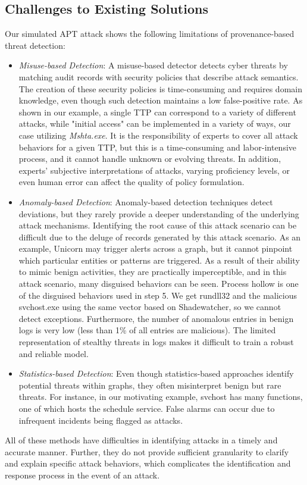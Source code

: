 \subsection{Challenges to Existing Solutions}
Our simulated APT attack shows the following limitations of provenance-based threat detection:
\begin{itemize}
    \item \textit{Misuse-based Detection}:  A misuse-based detector\cite{milajerdi2019holmes,milajerdi2019poirot} detects cyber threats by matching audit records with security policies that describe attack semantics. The creation of these security policies is time-consuming and requires domain knowledge, even though such detection maintains a low false-positive rate. As shown in our example, a single TTP can correspond to a variety of different attacks, while "initial access" can be implemented in a variety of ways, our case utilizing \textit{Mshta.exe}. It is the responsibility of experts to cover all attack behaviors for a given TTP, but this is a time-consuming and labor-intensive process, and it cannot handle unknown or evolving threats. In addition, experts' subjective interpretations of attacks, varying proficiency levels, or even human error can affect the quality of policy formulation.
    \item \textit{Anomaly-based Detection}: Anomaly-based detection techniques detect deviations, but they rarely provide a deeper understanding of the underlying attack mechanisms. Identifying the root cause of this attack scenario can be difficult due to the deluge of records generated by this attack scenario. As an example, Unicorn\cite{han2020unicorn} may trigger alerts across a graph, but it cannot pinpoint which particular entities or patterns are triggered. As a result of their ability to mimic benign activities, they are practically imperceptible, and in this attack scenario, many disguised behaviors can be seen. Process hollow is one of the disguised behaviors used in step 5. We get rundll32 and the malicious svchost.exe using the same vector based on Shadewatcher\cite{zengy2022shadewatcher}, so we cannot detect exceptions. Furthermore, the number of anomalous entries in benign logs is very low (less than 1\% of all entries are malicious). The limited representation of stealthy threats in logs makes it difficult to train a robust and reliable model. 
    \item \textit{Statistics-based Detection}: Even though statistics-based approaches \cite{liu2018towards,hassan2019nodoze,hassan2020we}identify potential threats within graphs, they often misinterpret benign but rare threats. For instance, in our motivating example, svchost has many functions, one of which hosts the schedule service. False alarms can occur due to infrequent incidents being flagged as attacks.
\end{itemize}
All of these methods have difficulties in identifying attacks in a timely and accurate manner. Further, they do not provide sufficient granularity to clarify and explain specific attack behaviors, which complicates the identification and response process in the event of an attack.



